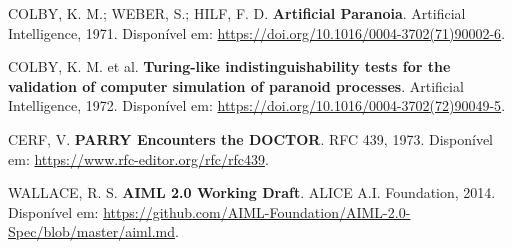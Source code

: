 \documentclass[12pt,a4paper]{article}
\begin{document}
\noindent [2] COLBY, K. M.; WEBER, S.; HILF, F. D. \textbf{Artificial Paranoia}. Artificial Intelligence, 1971. Disponível em: \url{https://doi.org/10.1016/0004-3702(71)90002-6}.

\noindent [3] COLBY, K. M. et al. \textbf{Turing-like indistinguishability tests for the validation of computer simulation of paranoid processes}. Artificial Intelligence, 1972. Disponível em: \url{https://doi.org/10.1016/0004-3702(72)90049-5}.

\noindent [4] CERF, V. \textbf{PARRY Encounters the DOCTOR}. RFC 439, 1973. Disponível em: \url{https://www.rfc-editor.org/rfc/rfc439}.

\noindent [5] WALLACE, R. S. \textbf{AIML 2.0 Working Draft}. ALICE A.I. Foundation, 2014. Disponível em: \url{https://github.com/AIML-Foundation/AIML-2.0-Spec/blob/master/aiml.md}.
\end{document}
